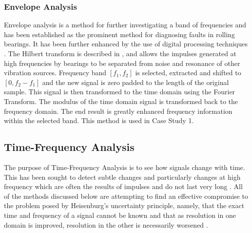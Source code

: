 \documentclass[conference]{IEEEtran}
\begin{document}
\subsubsection{Envelope Analysis} \label{Envelopes}
Envelope analysis is a method for further investigating a band of frequencies and has been established as the prominent method for diagnosing faults in rolling bearings. It has been further enhanced by the use of digital processing techniques \cite{Vibration Book}. The Hilbert transform is described in \cite{Bonnardot}, \cite{Vibration Book} and allows the impulses generated at high frequencies by bearings to be separated from noise and resonance of other vibration sources. Frequency band $[f_1, f_2]$ is selected, extracted and shifted to $[0, f_2-f_1]$ and the new signal is zero padded to the length of the original sample. This signal is then transformed to the time domain using the Fourier Transform. The modulus of the time domain signal is transformed back to the frequency domain. The end result is greatly enhanced frequency information within the selected band. This method is used in Case Study 1.

\subsection{Time-Frequency Analysis}

The purpose of Time-Frequency Analysis is to see how signals change with time. This has been sought to detect subtle changes and particularly changes at high frequency which are often the results of impulses and do not last very long \cite{Wavelets}\cite{Vibration Book}. All of the methods discussed below are attempting to find an effective compromise to the problem posed by Heisenburg's uncertainty principle, namely, that the exact time and frequency of a signal cannot be known and that as resolution in one domain is improved, resolution in the other is necessarily worsened \cite{Wavelets}.
\end{document}
